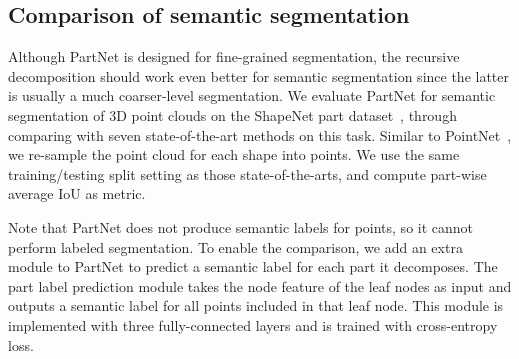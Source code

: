 \subsection{Comparison of semantic segmentation}
\label{subsec:semantic}
Although PartNet is designed for fine-grained segmentation, the recursive decomposition should work even better for semantic segmentation since the latter is usually a much coarser-level segmentation. We evaluate PartNet for semantic segmentation of 3D point clouds on the ShapeNet part dataset~\cite{Yi16}, through comparing with seven state-of-the-art methods on this task. Similar to PointNet~\cite{qi2016pointnet}, we re-sample the point cloud for each shape into  points. We use the same training/testing split setting as those state-of-the-arts, and compute part-wise average IoU as metric.

Note that PartNet does not produce semantic labels for points, so it cannot perform labeled segmentation. To enable the comparison, we add an extra module to PartNet to predict a semantic label for each part it decomposes. The part label prediction module takes the node feature of the leaf nodes as input and outputs a semantic label for all points included in that leaf node. This module is implemented with three fully-connected layers and is trained with cross-entropy loss.

\begin{table*}[!t]\centering\small
 \vspace{5pt}
\caption{Comparison of semantic segmentation on the ShapeNet part dataset~\cite{Yi16}. Metric is part-wise IoU ().}
\label{shapenet_table}\vspace{-8pt}
\end{table*}

